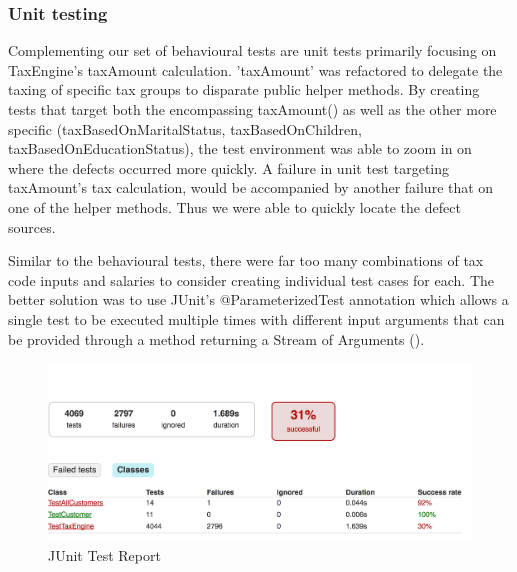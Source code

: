 \subsubsection{Unit testing}
Complementing our set of behavioural tests are unit tests primarily focusing on TaxEngine's taxAmount calculation. 'taxAmount' was refactored to delegate the taxing of specific tax groups to disparate public helper methods. By creating tests that target both the encompassing taxAmount() as well as the other more specific (taxBasedOnMaritalStatus, taxBasedOnChildren, taxBasedOnEducationStatus), the test environment was able to zoom in on where the defects occurred more quickly. A failure in unit test targeting taxAmount's  tax calculation, would be accompanied by another failure that on one of the helper methods. Thus we were able to quickly locate the defect sources. 

\par
Similar to the behavioural tests, there were far too many combinations of tax code inputs and salaries to consider creating individual test cases for each. The better solution was to use JUnit's @ParameterizedTest annotation which allows a single test to be executed multiple times with different input arguments that can be provided through a method returning a Stream of Arguments (). 

\begin{figure}[H]
\centering
\begin{mdframed}
\centering
\includegraphics[scale=0.5]{res/unit-test.png}
\caption{JUnit Test Report}    
\end{mdframed}
\end{figure}